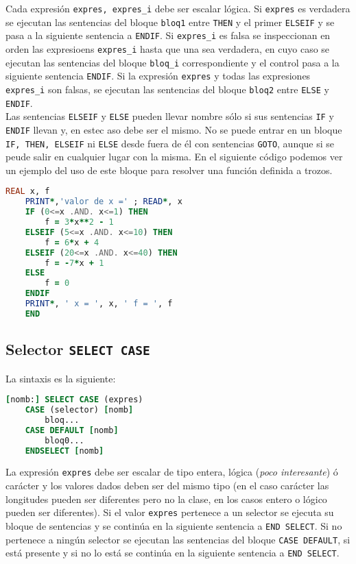 Cada expresión {\tt expres, expres\_i} debe ser escalar lógica. Si {\tt expres} es verdadera se ejecutan las sentencias del bloque {\tt bloq1} entre {\tt THEN} y el primer {\tt ELSEIF} y se pasa a la siguiente sentencia a \texttt{ENDIF}. Si \texttt{expres\_i} es falsa se inspeccionan en orden las expresioens \texttt{expres\_i} hasta que una sea verdadera, en cuyo caso se ejecutan las sentencias del bloque {\tt bloq\_i} correspondiente y el control pasa a la siguiente sentencia \texttt{ENDIF}. Si la expresión {\tt expres} y todas las expresiones {\tt expres\_i} son falsas, se ejecutan las sentencias del bloque \texttt{bloq2} entre {\tt ELSE} y {\tt ENDIF}. \\

Las sentencias {\tt ELSEIF} y {\tt ELSE} pueden llevar nombre sólo si sus sentencias {\tt IF} y {\tt ENDIF} llevan y, en estec aso debe ser el mismo. No se puede entrar en un bloque {\tt IF, THEN, ELSEIF} ni {\tt ELSE} desde fuera de él con sentencias {\tt GOTO}, aunque si se peude salir en cualquier lugar con la misma. En el siguiente código podemos ver un ejemplo del uso de este bloque para resolver una función definida a trozos.

\begin{lstlisting}[language=Fortran]
	REAL x, f
	PRINT*,'valor de x =' ; READ*, x
	IF (0<=x .AND. x<=1) THEN
		f = 3*x**2 - 1
	ELSEIF (5<=x .AND. x<=10) THEN
		f = 6*x + 4
	ELSEIF (20<=x .AND. x<=40) THEN
		f = -7*x + 1
	ELSE
		f = 0
	ENDIF
	PRINT*, ' x = ', x, ' f = ', f
	END
\end{lstlisting}


\subsection{Selector {\tt SELECT CASE}}

La sintaxis es la siguiente:

\begin{lstlisting}[language=Fortran]
	[nomb:] SELECT CASE (expres) 
	CASE (selector) [nomb]
		bloq... 
	CASE DEFAULT [nomb]
		bloq0... 
	ENDSELECT [nomb]
\end{lstlisting}

La expresión {\tt expres} debe ser escalar de tipo entera, lógica ({\it poco interesante}) ó carácter y los valores dados deben ser del mismo tipo (en el caso carácter las longitudes pueden ser diferentes pero no la clase, en los casos entero o lógico pueden ser diferentes). Si el valor {\tt expres} pertenece a un selector se ejecuta su bloque de sentencias y se continúa en la siguiente sentencia a  {\tt END SELECT}. Si no pertenece a ningún selector se ejecutan las sentencias del bloque \texttt{CASE DEFAULT}, si está presente y si no lo está se continúa en la siguiente sentencia a {\tt END SELECT}. \\

